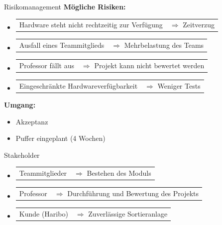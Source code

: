 \documentclass[aspectratio=169]{beamer}
\begin{document}
	\begin{frame}{Risikomanagement}
		\textbf{Mögliche Risiken:}
		\begin{itemize}
			\item \begin{tabular}[t]{@{}p{7.5cm} l@{}}
				Hardware steht nicht rechtzeitig zur Verfügung & $\Rightarrow$ Zeitverzug
			\end{tabular}
			\item \begin{tabular}[t]{@{}p{7.5cm} l@{}}
				Ausfall eines Teammitglieds & $\Rightarrow$ Mehrbelastung des Teams
			\end{tabular}
			\item \begin{tabular}[t]{@{}p{7.5cm} l@{}}
				Professor fällt aus & $\Rightarrow$ Projekt kann nicht bewertet werden
			\end{tabular}
			\item \begin{tabular}[t]{@{}p{7.5cm} l@{}}
				Eingeschränkte Hardwareverfügbarkeit & $\Rightarrow$ Weniger Tests
			\end{tabular}
		\end{itemize}
		\textbf{Umgang:}\\
		\begin{itemize}
			\item Akzeptanz
			\item Puffer eingeplant (4 Wochen)
		\end{itemize} 
	\end{frame}
	
	\begin{frame}{Stakeholder}
		\begin{itemize}
			\item \begin{tabular}[t]{@{}p{3cm} l@{}}
				Teammitglieder & $\Rightarrow$ Bestehen des Moduls
			\end{tabular}
			\item \begin{tabular}[t]{@{}p{3cm} l@{}}
				Professor & $\Rightarrow$ Durchführung und Bewertung des Projekts
			\end{tabular}
			\item \begin{tabular}[t]{@{}p{3cm} l@{}}
				Kunde (Haribo) & $\Rightarrow$ Zuverlässige Sortieranlage
			\end{tabular}
		\end{itemize}
	\end{frame}
	
\end{document}
